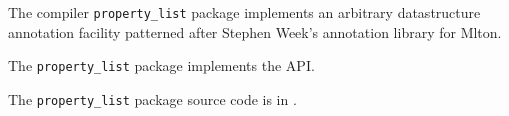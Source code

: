 
The compiler {\tt property\_list} package implements an arbitrary datastructure annotation 
facility patterned after Stephen Week's annotation library for Mlton.

The {\tt property\_list} package implements the  API.

The {\tt property\_list} package source code is in .

